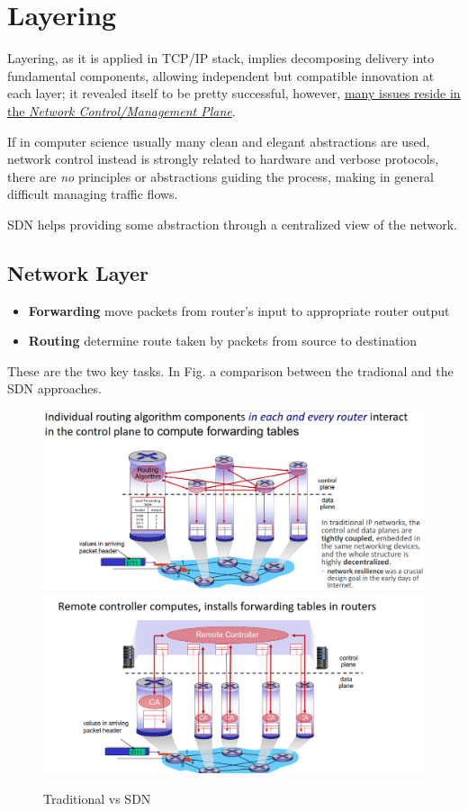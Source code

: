 \section{Layering}
Layering, as it is applied in TCP/IP stack, implies decomposing delivery into fundamental components, allowing independent but compatible innovation at each layer; it revealed itself to be pretty successful, however, \ul{many issues reside in the \textit{Network Control/Management Plane}}.

If in computer science usually many clean and elegant abstractions are used, network control instead is strongly related to hardware and verbose protocols, there are \textit{no} principles or abstractions guiding the process, making in general difficult managing traffic flows.

SDN helps providing some abstraction through a centralized view of the network.

\subsection{Network Layer}
\begin{itemize}
   \item \textbf{Forwarding} move packets from router’s input to appropriate router output
   \item \textbf{Routing} determine route taken by packets from
   source to destination
\end{itemize}

These are the two key tasks. In Fig. a comparison between the tradional and the SDN approaches.
\begin{figure}[htbp]
   \centering
   \includegraphics[width=0.45\columnwidth]{images/sdn_planes1.png}
   \includegraphics[width=0.45\columnwidth]{images/sdn_planes2.png}
   \caption{Traditional vs SDN}
   \label{fig:sdn_planes}
\end{figure}

